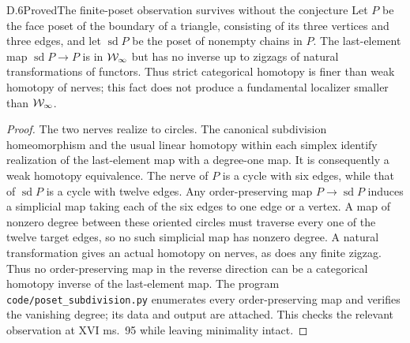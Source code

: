 \begin{claim}{D.6}{Proved}{The finite-poset observation survives without the conjecture}
Let $P$ be the face poset of the boundary of a triangle, consisting of its three vertices and three edges, and let $\operatorname{sd}P$ be the poset of nonempty chains in $P$. The last-element map $\operatorname{sd}P\to P$ is in $\mathcal{W}_{\infty}$ but has no inverse up to zigzags of natural transformations of functors. Thus strict categorical homotopy is finer than weak homotopy of nerves; this fact does not produce a fundamental localizer smaller than $\mathcal{W}_{\infty}$.
\end{claim}
\begin{proof}
The two nerves realize to circles. The canonical subdivision homeomorphism and the usual linear homotopy within each simplex identify realization of the last-element map with a degree-one map. It is consequently a weak homotopy equivalence. The nerve of $P$ is a cycle with six edges, while that of $\operatorname{sd}P$ is a cycle with twelve edges. Any order-preserving map $P\to\operatorname{sd}P$ induces a simplicial map taking each of the six edges to one edge or a vertex. A map of nonzero degree between these oriented circles must traverse every one of the twelve target edges, so no such simplicial map has nonzero degree. A natural transformation gives an actual homotopy on nerves, as does any finite zigzag. Thus no order-preserving map in the reverse direction can be a categorical homotopy inverse of the last-element map. The program \texttt{code/poset\_subdivision.py} enumerates every order-preserving map and verifies the vanishing degree; its data and output are attached. This checks the relevant observation at XVI ms.~95 while leaving minimality intact.
\end{proof}
